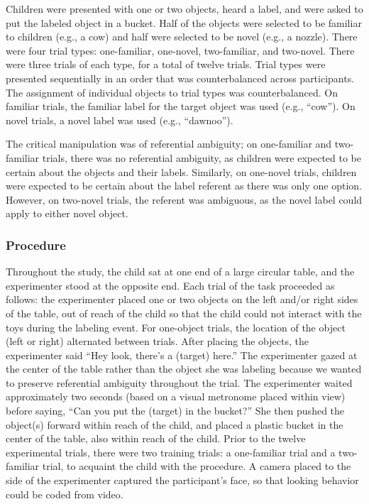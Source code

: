 \documentclass[10pt, letterpaper]{article}
\begin{document}
Children were presented with one or two objects, heard a label, and were
asked to put the labeled object in a bucket. Half of the objects were
selected to be familiar to children (e.g., a cow) and half were selected
to be novel (e.g., a nozzle). There were four trial types: one-familiar,
one-novel, two-familiar, and two-novel. There were three trials of each
type, for a total of twelve trials. Trial types were presented
sequentially in an order that was counterbalanced across participants.
The assignment of individual objects to trial types was counterbalanced.
On familiar trials, the familiar label for the target object was used
(e.g., ``cow''). On novel trials, a novel label was used (e.g.,
``dawnoo'').

The critical manipulation was of referential ambiguity; on one-familiar
and two-familiar trials, there was no referential ambiguity, as children
were expected to be certain about the objects and their labels.
Similarly, on one-novel trials, children were expected to be certain
about the label referent as there was only one option. However, on
two-novel trials, the referent was ambiguous, as the novel label could
apply to either novel object.

\subsubsection{Procedure}\label{procedure}

Throughout the study, the child sat at one end of a large circular
table, and the experimenter stood at the opposite end. Each trial of the
task proceeded as follows: the experimenter placed one or two objects on
the left and/or right sides of the table, out of reach of the child so
that the child could not interact with the toys during the labeling
event. For one-object trials, the location of the object (left or right)
alternated between trials. After placing the objects, the experimenter
said ``Hey look, there's a (target) here.'' The experimenter gazed at
the center of the table rather than the object she was labeling because
we wanted to preserve referential ambiguity throughout the trial. The
experimenter waited approximately two seconds (based on a visual
metronome placed within view) before saying, ``Can you put the (target)
in the bucket?'' She then pushed the object(s) forward within reach of
the child, and placed a plastic bucket in the center of the table, also
within reach of the child. Prior to the twelve experimental trials,
there were two training trials: a one-familiar trial and a two-familiar
trial, to acquaint the child with the procedure. A camera placed to the
side of the experimenter captured the participant's face, so that
looking behavior could be coded from video.
\end{document}
